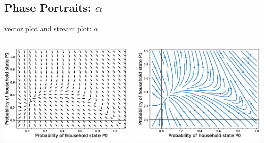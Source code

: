 \documentclass[smaller,aspectratio=169, toc=bibliography]{beamer}
\begin{document}
\subsection*{Phase Portraits: $\alpha$ }
\begin{frame}{vector plot and stream plot: $\alpha$}
\begin{columns}[c]
        \begin{center}
        \includegraphics[scale=0.3]{phase_portrait/041_g5.eps}
        \caption{\(\alpha=0.8, \beta=0.2, \gamma=0.2\)} 
        \end{center}
        \begin{center}
        \includegraphics[scale=0.3]{phase_portrait/041_g5s.eps}
        \caption{\(\alpha=0.8, \beta=0.2, \gamma=0.2\)}
        \end{center}  
\end{columns}
\end{frame}
\end{document}
